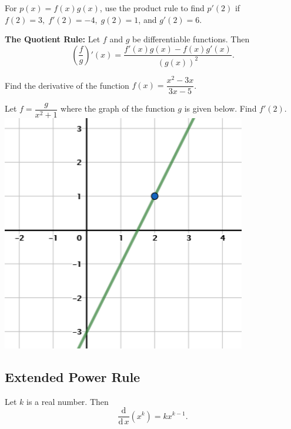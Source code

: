 \begin{example}
For \(p(x)=f(x)g(x)\), use the product rule to find \(p'(2)\) if
\(f(2)=3,\; f'(2)=-4,\; g(2)=1\), and \(g'(2)=6\).
\end{example}
\vspace*{6\baselineskip}

\textbf{The Quotient Rule:} Let \(f\) and \(g\) be differentiable
functions. Then
\[\left(\dfrac{f}{g}\right)'(x)=\dfrac{f'(x)g(x)-f(x)g'(x)}{(g(x))^2}.\]

\begin{example}
Find the derivative of the function \(f(x)=\dfrac{x^2-3x}{3x-5}\).
\end{example}
\vspace*{6\baselineskip}

\begin{example}
Let \(f=\dfrac{g}{x^2+1}\) where the graph of the function \(g\) is
given below. Find \(f'(2)\).\\
\includegraphics[width=0.8\textwidth]{img/quotientRuleLinear.png}
\end{example}
\vspace*{6\baselineskip}

\hypertarget{extended-power-rule}{%
\subsection{Extended Power Rule}\label{extended-power-rule}}

Let \(k\) is a real number. Then
\[\dfrac{\mathrm{d}}{\mathrm{d}\,x}(x^k)=kx^{k-1}.\]


